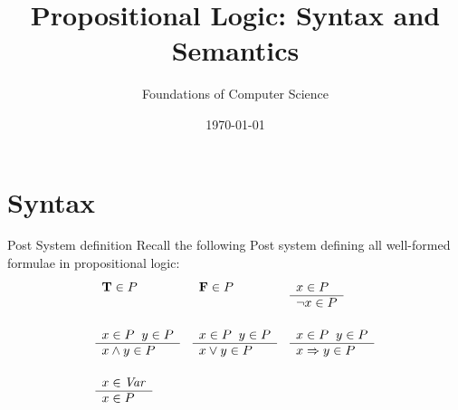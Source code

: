 \documentclass[style=sailor,size=12pt]{powerdot}
\title{Propositional Logic: Syntax and Semantics}
\author{Foundations of Computer Science}
\date{\today}
\newcommand{\id}[1]{\mbox{\it #1\/}}
\newcommand{\bid}[1]{\mbox{\bf #1}}
\theoremstyle{definition}
\begin{document}
\maketitle
\section[slide=true]{Syntax}

\begin{wideslide}[bm=,toc=]{Post System definition}
Recall the following Post system defining all well-formed formulae in
propositional logic:
\begin{displaymath}
\begin{array}{lll}
        \begin{array}[t]{l}
        \bid{T}\in P
        \end{array}
&
        \begin{array}[t]{l}
        \bid{F}\in P
        \end{array}
&
	\begin{array}[t]{l}
        x \in P \\
        \hline
        \neg x \in P
        \end{array} \\[6ex]

	\begin{array}[t]{l}
	x \in P \;\;y \in P \\
	\hline
	x \wedge y \in P
	\end{array}
&
	\begin{array}[t]{l}
	x \in P \;\;y \in P \\
	\hline
	x \vee y \in P
	\end{array}
&
	\begin{array}[t]{l}
	x \in P \;\;y \in P \\
	\hline
	x \Rightarrow y \in P
	\end{array} \\[6ex]

	\begin{array}[t]{l}
        x \in \id{Var} \\
        \hline
        x \in P
        \end{array}
\end{array}
\end{displaymath}

\end{wideslide}
\end{document}

